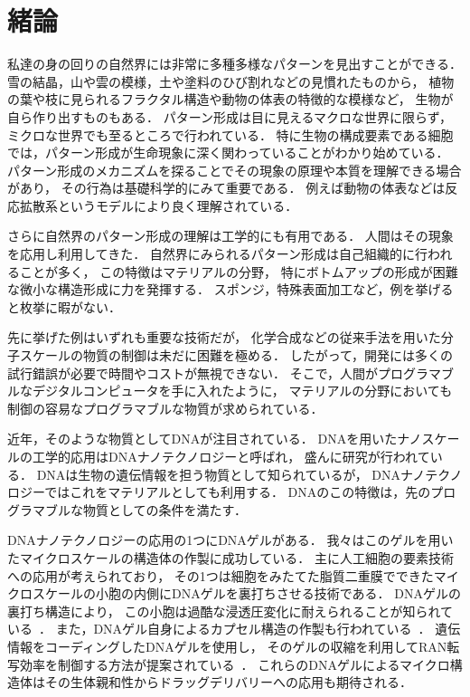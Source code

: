 \chapter{緒論}

私達の身の回りの自然界には非常に多種多様なパターンを見出すことができる．
雪の結晶，山や雲の模様，土や塗料のひび割れなどの見慣れたものから，
植物の葉や枝に見られるフラクタル構造や動物の体表の特徴的な模様など，
生物が自ら作り出すものもある．
パターン形成は目に見えるマクロな世界に限らず，
ミクロな世界でも至るところで行われている．
特に生物の構成要素である細胞では，パターン形成が生命現象に深く関わっていることがわかり始めている．
パターン形成のメカニズムを探ることでその現象の原理や本質を理解できる場合があり，
その行為は基礎科学的にみて重要である．
例えば動物の体表などは反応拡散系というモデルにより良く理解されている．

さらに自然界のパターン形成の理解は工学的にも有用である．
人間はその現象を応用し利用してきた． 
自然界にみられるパターン形成は自己組織的に行われることが多く，
この特徴はマテリアルの分野，
特にボトムアップの形成が困難な微小な構造形成に力を発揮する．
スポンジ，特殊表面加工など，例を挙げると枚挙に暇がない．

先に挙げた例はいずれも重要な技術だが，
化学合成などの従来手法を用いた分子スケールの物質の制御は未だに困難を極める．
したがって，開発には多くの試行錯誤が必要で時間やコストが無視できない．
そこで，人間がプログラマブルなデジタルコンピュータを手に入れたように，
マテリアルの分野においても制御の容易なプログラマブルな物質が求められている．

近年，そのような物質としてDNAが注目されている．
DNAを用いたナノスケールの工学的応用はDNAナノテクノロジーと呼ばれ，
盛んに研究が行われている．
DNAは生物の遺伝情報を担う物質として知られているが，
DNAナノテクノロジーではこれをマテリアルとしても利用する．
DNAのこの特徴は，先のプログラマブルな物質としての条件を満たす．

DNAナノテクノロジーの応用の1つにDNAゲルがある．
我々はこのゲルを用いたマイクロスケールの構造体の作製に成功している．
主に人工細胞の要素技術への応用が考えられており，
その1つは細胞をみたてた脂質二重膜でできたマイクロスケールの小胞の内側にDNAゲルを裏打ちさせる技術である．
DNAゲルの裏打ち構造により，
この小胞は過酷な浸透圧変化に耐えられることが知られている~\cite{kurokawa2017dna}．
また，DNAゲル自身によるカプセル構造の作製も行われている~\cite{morita2017formation}．
遺伝情報をコーディングしたDNAゲルを使用し，
そのゲルの収縮を利用してRAN転写効率を制御する方法が提案されている~\cite{watanabe}．
これらのDNAゲルによるマイクロ構造体はその生体親和性からドラッグデリバリーへの応用も期待される．

